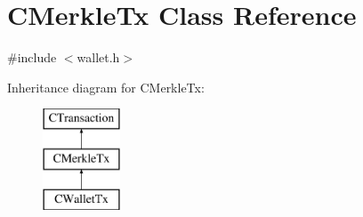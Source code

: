\hypertarget{class_c_merkle_tx}{}\section{C\+Merkle\+Tx Class Reference}
\label{class_c_merkle_tx}


{\ttfamily \#include $<$wallet.\+h$>$}

Inheritance diagram for C\+Merkle\+Tx\+:\begin{figure}[H]
\begin{center}
\leavevmode
\includegraphics[height=3.000000cm]{class_c_merkle_tx}
\end{center}
\end{figure}

